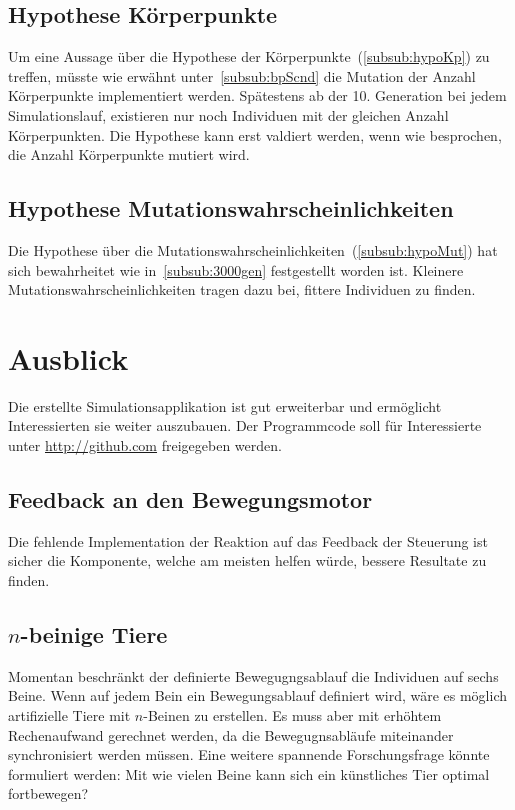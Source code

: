     \subsection{Hypothese Körperpunkte}

      Um eine Aussage über die Hypothese der Körperpunkte~(\vref{subsub:hypoKp}) zu treffen,
      müsste wie erwähnt unter~\vref{subsub:bpScnd} die Mutation der Anzahl Körperpunkte implementiert werden.
      Spätestens ab der 10. Generation bei jedem Simulationslauf,
      existieren nur noch Individuen mit der gleichen Anzahl Körperpunkten.
      Die Hypothese kann erst valdiert werden, wenn wie besprochen, die Anzahl Körperpunkte mutiert wird.


    \subsection{Hypothese Mutationswahrscheinlichkeiten}

      Die Hypothese über die Mutationswahrscheinlichkeiten~(\vref{subsub:hypoMut}) hat sich bewahrheitet
      wie in~\vref{subsub:3000gen} festgestellt worden ist.
      Kleinere Mutationswahrscheinlichkeiten tragen dazu bei, fittere Individuen zu finden.

  \section{Ausblick\label{sec:ausblick}}


    Die erstellte Simulationsapplikation ist gut erweiterbar und ermöglicht Interessierten sie weiter auszubauen.
    Der Programmcode soll für Interessierte unter \url{http://github.com} freigegeben werden.

    \subsection{Feedback an den Bewegungsmotor\label{sub:PerspectiveFeedback}}

      Die fehlende Implementation der Reaktion auf das Feedback der Steuerung ist sicher die Komponente,
      welche am meisten helfen würde, bessere Resultate zu finden.

    \subsection{\(n\)-beinige Tiere}
      Momentan beschränkt der definierte Bewegugngsablauf die Individuen auf sechs Beine.
      Wenn auf jedem Bein ein Bewegungsablauf definiert wird, wäre es möglich artifizielle Tiere mit \(n\)-Beinen zu erstellen.
      Es muss aber mit erhöhtem Rechenaufwand gerechnet werden, da die Bewegugnsabläufe miteinander synchronisiert werden müssen.
      Eine weitere spannende Forschungsfrage könnte formuliert werden: Mit wie vielen Beine kann sich ein künstliches Tier optimal fortbewegen?

